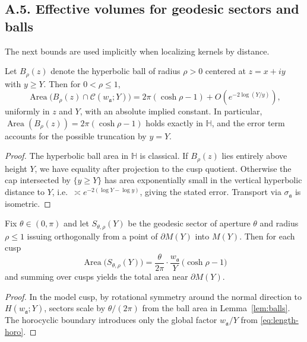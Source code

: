 \subsection*{A.5. Effective volumes for geodesic sectors and balls}

\noindent
The next bounds are used implicitly when localizing kernels by distance.

\begin{lemma}\label{lem:balls}
Let $B_\rho(z)$ denote the hyperbolic ball of radius $\rho>0$ centered at
$z=x+iy$ with $y\ge Y$. Then for $0<\rho\le 1$,
\[
\operatorname{Area}\big(B_\rho(z)\cap \mathcal C(w_{\mathfrak a};Y)\big)
= 2\pi(\cosh\rho-1)+ O\!\left(e^{-2\log(Y/y)}\right),
\]
uniformly in $z$ and $Y$, with an absolute implied constant. In particular,
$\operatorname{Area}(B_\rho(z))=2\pi(\cosh\rho-1)$ holds exactly in $\mathbb H$,
and the error term accounts for the possible truncation by $y=Y$.
\end{lemma}

\begin{proof}
The hyperbolic ball area in $\mathbb H$ is classical. If $B_\rho(z)$ lies
entirely above height $Y$, we have equality after projection to the cusp quotient.
Otherwise the cap intersected by $\{y\ge Y\}$ has area exponentially small in
the vertical hyperbolic distance to $Y$, i.e.\ $\asymp e^{-2(\log Y-\log y)}$,
giving the stated error. Transport via $\sigma_{\mathfrak a}$ is isometric.
\end{proof}

\begin{proposition}\label{prop:sectors}
Fix $\theta\in(0,\pi)$ and let $S_{\theta,\rho}(Y)$ be the geodesic sector of
aperture $\theta$ and radius $\rho\le 1$ issuing orthogonally from a point of
$\partial M(Y)$ into $M(Y)$. Then for each cusp
\[
\operatorname{Area}\big(S_{\theta,\rho}(Y)\big)
= \frac{\theta}{2\pi}\cdot \frac{w_{\mathfrak a}}{Y}\,\big(\cosh\rho-1\big)
\]
and summing over cusps yields the total area near $\partial M(Y)$.
\end{proposition}

\begin{proof}
In the model cusp, by rotational symmetry around the normal direction to
$H(w_{\mathfrak a};Y)$, sectors scale by $\theta/(2\pi)$ from the ball area in
Lemma~\ref{lem:balls}. The horocyclic boundary introduces only the global
factor $w_{\mathfrak a}/Y$ from \eqref{eq:length-horo}.
\end{proof}

